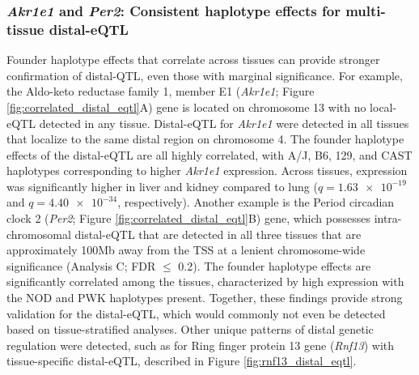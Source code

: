 \documentclass[9pt,twocolumn,twoside]{gsajnl}
\begin{document}
\subsubsection{\textit{Akr1e1} and \textit{Per2}: Consistent haplotype effects for multi-tissue distal-eQTL}
Founder haplotype effects that correlate across tissues can provide stronger confirmation of distal-QTL, even those with marginal significance. 
For example, the Aldo-keto reductase family 1, member E1 (\textit{Akr1e1}; Figure \ref{fig:correlated_distal_eqtl}A) gene is located on chromosome 13 with no local-eQTL detected in any tissue. Distal-eQTL for \textit{Akr1e1} were detected in all tissues that localize to the same distal region on chromosome 4. The founder haplotype effects of the distal-eQTL are all highly correlated, with A/J, B6, 129, and CAST haplotypes corresponding to higher \textit{Akr1e1} expression. Across tissues, expression was significantly higher in liver and kidney compared to lung ($q = \num{1.63e-19}$ and $q = \num{4.40e-34}$, respectively).
Another example is the Period circadian clock 2 (\textit{Per2}; Figure \ref{fig:correlated_distal_eqtl}B) gene, which possesses intra-chromosomal distal-eQTL that are detected in all three tissues that are approximately 100Mb away from the TSS at a lenient chromosome-wide significance (Analysis C; FDR $\leq$ 0.2). The founder haplotype effects are significantly correlated among the tissues, characterized by high expression with the NOD and PWK haplotypes present. Together, these findings provide strong validation for the distal-eQTL, which would commonly not even be detected based on tissue-stratified analyses.
Other unique patterns of distal genetic regulation were detected, such as for Ring finger protein 13 gene (\textit{Rnf13}) with tissue-specific distal-eQTL, described in Figure \ref{fig:rnf13_distal_eqtl}.
\end{document}
